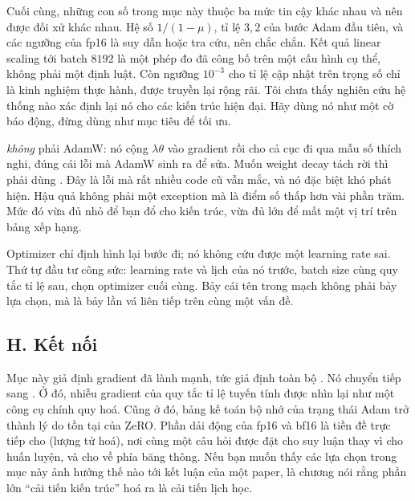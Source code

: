 \documentclass[../../../deep_learning.tex]{subfiles}
\begin{document}
Cuối cùng, những con số trong mục này thuộc ba mức tin cậy khác nhau và nên được đối xử khác nhau. Hệ số \(1/(1-\mu)\), tỉ lệ \(3{,}2\) của bước Adam đầu tiên, và các ngưỡng của fp16 là suy dẫn hoặc tra cứu, nên chắc chắn. Kết quả linear scaling tới batch \(8192\) là một phép đo đã công bố trên một cấu hình cụ thể, không phải một định luật. Còn ngưỡng \(10^{-3}\) cho tỉ lệ cập nhật trên trọng số chỉ là kinh nghiệm thực hành, được truyền lại rộng rãi. Tôi chưa thấy nghiên cứu hệ thống nào xác định lại nó cho các kiến trúc hiện đại. Hãy dùng nó như một cờ báo động, đừng dùng như mục tiêu để tối ưu.

\begin{cambay}
 \emph{không} phải AdamW: nó cộng \(\lambda\theta\) vào gradient rồi cho cả cục đi qua mẫu số thích nghi, đúng cái lỗi mà AdamW sinh ra để sửa. Muốn weight decay tách rời thì phải dùng . Đây là lỗi mà rất nhiều code cũ vẫn mắc, và nó đặc biệt khó phát hiện. Hậu quả không phải một exception mà là điểm số thấp hơn vài phần trăm. Mức đó vừa đủ nhỏ để bạn đổ cho kiến trúc, vừa đủ lớn để mất một vị trí trên bảng xếp hạng.
\end{cambay}

\begin{cannho}
Optimizer chỉ định hình lại bước đi; nó không cứu được một learning rate sai. Thứ tự đầu tư công sức: learning rate và lịch của nó trước, batch size cùng quy tắc tỉ lệ sau, chọn optimizer cuối cùng. Bảy cái tên trong mạch không phải bảy lựa chọn, mà là bảy lần vá liên tiếp trên cùng một vấn đề. 
\end{cannho}

\subsection{H. Kết nối}
Mục này giả định gradient đã lành mạnh, tức giả định toàn bộ . Nó chuyển tiếp sang . Ở đó, nhiễu gradient của quy tắc tỉ lệ tuyến tính được nhìn lại như một công cụ chính quy hoá. Cũng ở đó, bảng kế toán bộ nhớ của trạng thái Adam trở thành lý do tồn tại của ZeRO. Phần dải động của fp16 và bf16 là tiền đề trực tiếp cho  (lượng tử hoá), nơi cùng một câu hỏi được đặt cho suy luận thay vì cho huấn luyện, và cho  về phía băng thông. Nếu bạn muốn thấy các lựa chọn trong mục này ảnh hưởng thế nào tới kết luận của một paper,  là chương nói rằng phần lớn ``cải tiến kiến trúc'' hoá ra là cải tiến lịch học.
\end{document}
